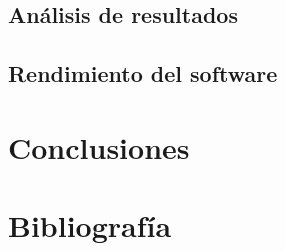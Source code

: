 \documentclass[11pt, titlepage,a4paper]{article}
\begin{document}
\subsection{Análisis de resultados}

\subsection{Rendimiento del software}

\section{Conclusiones}

\section{Bibliografía}



\end{document}
